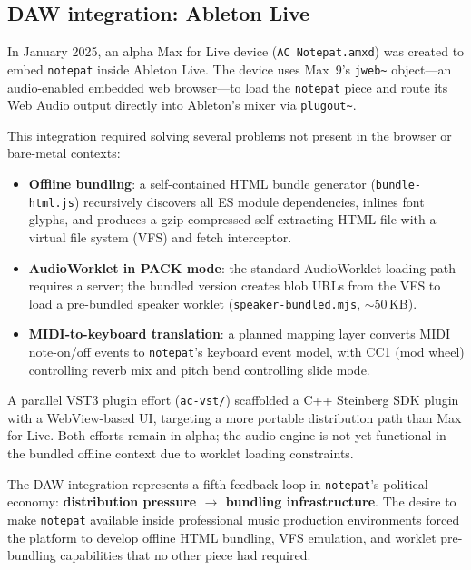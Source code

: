 \documentclass[10pt,letterpaper,twocolumn]{article}
\begin{document}
\subsection{DAW integration: Ableton Live}

In January 2025, an alpha Max for Live device (\texttt{AC Notepat.amxd}) was created to embed \texttt{notepat} inside Ableton Live. The device uses Max~9's \texttt{jweb\textasciitilde} object---an audio-enabled embedded web browser---to load the \texttt{notepat} piece and route its Web Audio output directly into Ableton's mixer via \texttt{plugout\textasciitilde}.

This integration required solving several problems not present in the browser or bare-metal contexts:

\begin{itemize}
  \item \textbf{Offline bundling}: a self-contained HTML bundle generator (\texttt{bundle-html.js}) recursively discovers all ES module dependencies, inlines font glyphs, and produces a gzip-compressed self-extracting HTML file with a virtual file system (VFS) and fetch interceptor.
  \item \textbf{AudioWorklet in PACK mode}: the standard AudioWorklet loading path requires a server; the bundled version creates blob URLs from the VFS to load a pre-bundled speaker worklet (\texttt{speaker-bundled.mjs}, $\sim$50\,KB).
  \item \textbf{MIDI-to-keyboard translation}: a planned mapping layer converts MIDI note-on/off events to \texttt{notepat}'s keyboard event model, with CC1 (mod wheel) controlling reverb mix and pitch bend controlling slide mode.
\end{itemize}

A parallel VST3 plugin effort (\texttt{ac-vst/}) scaffolded a C++ Steinberg SDK plugin with a WebView-based UI, targeting a more portable distribution path than Max for Live. Both efforts remain in alpha; the audio engine is not yet functional in the bundled offline context due to worklet loading constraints.

The DAW integration represents a fifth feedback loop in \texttt{notepat}'s political economy: \textbf{distribution pressure $\rightarrow$ bundling infrastructure}. The desire to make \texttt{notepat} available inside professional music production environments forced the platform to develop offline HTML bundling, VFS emulation, and worklet pre-bundling capabilities that no other piece had required.
\end{document}
